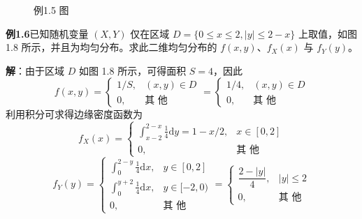\documentclass[11pt,openany,UTF8]{ctexbook}
\newcommand{\dif}{\mathrm{d}}                      %
\begin{document}
\begin{figure}[htbp]
  \caption{例1.5 图}
  \label{fig:1.7}
\end{figure}

\begin{examplebox}
\textbf{例1.6}\quad 已知随机变量 $(X,Y)$ 仅在区域 $D=\{0\leqslant x\leqslant 2,\lvert y\rvert\leqslant 2-x\}$ 上取值\nobreak，如图 1.8 所示\nobreak，并且为均匀分布\nobreak。求此二维均匀分布的 $f(x,y)$\nobreak、$f_X(x)$ 与 $f_Y(y)$\nobreak。

\textbf{解}\nobreak：由于区域 $D$ 如图 1.8 所示\nobreak，可得面积 $S=4$\nobreak，因此
\[
f(x,y)=\begin{cases}1/S,&(x,y)\in D\\[2pt] 0,&\text{其 他}\end{cases}
=\begin{cases}1/4,&(x,y)\in D\\[2pt] 0,&\text{其 他}\end{cases}
\]
利用积分可求得边缘密度函数为
\[
f_X(x)=\begin{cases}\displaystyle\int_{x-2}^{2-x}\frac{1}{4}\dif y=1-x/2,&x\in[0,2]\\[10pt] 0,&\text{其 他}\end{cases}
\]
\[
f_Y(y)=\begin{cases}\displaystyle\int_{0}^{2-y}\frac{1}{4}\dif x,&y\in[0,2]\\[10pt]
\displaystyle\int_{0}^{y+2}\frac{1}{4}\dif x,&y\in[-2,0)\\[10pt]
0,&\text{其 他}\end{cases}
=\begin{cases}\dfrac{2-\lvert y\rvert}{4},&\lvert y\rvert\leqslant 2\\[8pt] 0,&\text{其 他}\end{cases}
\]
\end{examplebox}
\end{document}
